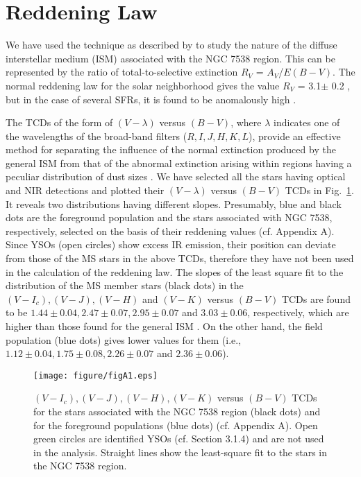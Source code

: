 \documentclass[a4paper,fleqn,usenatbib,useAMS]{mnras}
\begin{document}
\section{Reddening Law}

We have used the technique as described by \citet{2003AA...397..191P} to study the nature of the
diffuse interstellar medium (ISM) associated with the NGC 7538 region.
This can be represented by the ratio of total-to-selective extinction $R_V$ = $A_V$/$E(B-V)$.
The normal reddening law for the solar neighborhood gives the 
value $R_V$ = 3.1$\pm$ 0.2 \citep{2003dge..conf.....W, 1989AJ.....98..611G, 2011JKAS...44...39L},
but in the case of several SFRs, it is found to be
anomalously high \citep[see e.g.,][]{ 2000PASJ...52..847P, 2008MNRAS.383.1241P, 2012AJ....143...41H, 2013ApJ...764..172P, 2014A&A...567A.109K}. 

The TCDs of the form of $(V - \lambda)$ versus $(B - V)$,
where $\lambda$ indicates one of the wavelengths of the broad-band filters ($R, I, J, H, K, L$), 
provide an effective method for separating the influence of the normal extinction produced by
the general ISM from that of the abnormal extinction arising within regions
having a peculiar distribution of dust sizes \citep[cf.][]{1990A&A...227L...5C, 2000PASJ...52..847P}.
We have selected all the stars having optical and NIR detections and plotted
their  $(V - \lambda)$ versus $(B - V)$ TCDs in Fig.~\ref{2color}.
It reveals two distributions having different slopes. Presumably, blue 
and black dots are the foreground population and the stars associated with NGC 7538, respectively, selected on the basis of their reddening values (cf. Appendix A).
Since YSOs (open circles) show excess IR emission, their position can deviate from those of the MS stars in the above TCDs, therefore
they  have not been used in the calculation of the reddening law.
The slopes of the least square fit to the distribution of the MS member 
stars (black dots) in the $(V-I_c),(V-J),(V-H)$ and $(V-K)$ versus $(B-V)$ TCDs are found to be
$1.44\pm0.04, 2.47\pm0.07, 2.95\pm0.07$ and $3.03\pm0.06$, respectively, which are higher
than those found for the general ISM \citep[1.10, 1.96, 2.42 and 2.60; cf.,][]{2003AA...397..191P}. On the other hand, 
the field population (blue dots) gives lower values for them (i.e., $1.12\pm0.04, 1.75\pm0.08, 2.26\pm0.07$ and $2.36\pm0.06$).


\begin{figure}
\centering\texttt{[image: figure/figA1.eps]}
\caption{\label{2color} $(V-I_c),(V - J), (V -H), (V - K)$ versus $(B - V)$ TCDs
for the stars associated with the NGC 7538 region (black dots) and for the foreground populations (blue dots) (cf. Appendix A). 
Open green circles are identified YSOs (cf. Section 3.1.4) and are not used in the analysis. 
Straight lines show the least-square fit to the stars in the NGC 7538 region.}
\end{figure}
\end{document}
